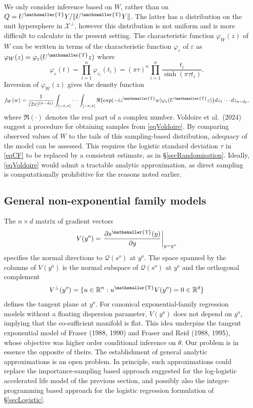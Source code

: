 \documentclass[10pt, reqno]{amsart}
\numberwithin{equation}{section}
\newcommand{\cosuff}{\mathcal{Q}}
\newcommand{\RR}{\mathbb{R}}
\newcommand{\T}{{\mathsmaller {\rm T}}}
\begin{document}
We only consider inference based on $W$, rather than on $Q=U^\T Y/\|U^\T Y\|$. The latter has a distribution on the unit hypersphere in $\mathcal{X}^\perp$, however this distribution is not uniform and is more difficult to calculate in the present setting. The characteristic function $\varphi_W(z)$ of $W$ can be written in terms of the characteristic function $\varphi_\varepsilon$ of $\varepsilon$ as $\varphi_{W}(z) = \varphi_\varepsilon(U^\T z)$ where
%
\begin{equation}\label{eqCF}
	\varphi_\varepsilon(t) = \prod_{i=1}^n \varphi_{\varepsilon_i}(t_i) = (\pi \tau)^n \prod_{i=1}^n \frac{t_i}{\sinh(\pi\tau t_i)}.
\end{equation}
%
Inversion of $\varphi_{W}(z)$ gives the density function 
%
\begin{equation}\label{eqVoldoire}
	f_{W}(w)=\frac{1}{(2\pi)^{(n-d_\theta)}} \int_{[-\pi, \pi]} \cdots \int_{[-\pi, \pi]} \Re\{\exp(-i z^\T w) \varphi_\varepsilon(U^\T z)\} dz_1\cdots dz_{n-d_\theta},
\end{equation}
%
where $\Re(\cdot)$ denotes the real part of a complex number. Voldoire et al.~(2024) suggest a procedure for obtaining samples from \eqref{eqVoldoire}. By comparing observed values of $W$ to the tails of this sampling-based distribution, adequacy of the model can be assessed. This requires the logistic standard deviation $\tau$ in \eqref{eqCF} to be replaced by a consistent estimate, as in \S \ref{secRandomisation}. Ideally, \eqref{eqVoldoire} would admit a tractable analytic approximation, as direct sampling is computationally prohibitive for the reasons noted earlier.



\subsection{General non-exponential family models}\label{secTangent}

The $n\times d$ matrix of gradient vectors
%
\begin{equation}\label{eqV}
	V(y^o)=\left.\frac{\partial s^\T(y)}{\partial y}\right|_{y=y^o}
\end{equation}
specifies the normal directions to $\cosuff(s^o)$ at $y^o$. The space spanned by the columns of $V(y^o)$ is the normal subspace of $\cosuff(s^o)$ at $y^o$ and the orthogonal complement
\[
V^\perp(y^o)=\{u\in\RR^n: u^\T V(y^o) = 0\in \RR^d\}
\] 
defines the tangent plane at $y^o$. For canonical exponential-family regression models without a floating dispersion parameter, $V(y^o)$ does not depend on $y^o$, implying that the co-sufficient manifold is flat. This idea underpins the tangent exponential model of Fraser (1988, 1990) and Fraser and Reid (1988, 1995), whose objective was higher order conditional inference on $\theta$. Our problem is in essence the opposite of theirs. The establishment of general analytic approximations is an open problem. In principle, such approximations could replace the importance-sampling based approach suggested for the log-logistic accelerated life model of the previous section, and possibly also the integer-programming based approach for the logistic regression formulation of \S \ref{secLogistic}.
\end{document}
